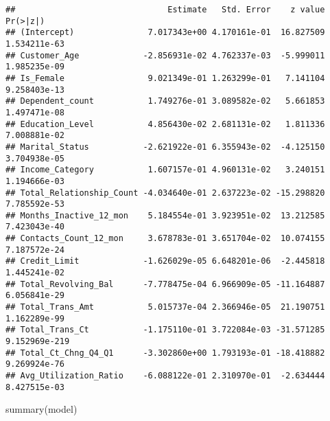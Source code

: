 \documentclass[
]{article}
\newenvironment{Shaded}{\begin{snugshade}}{\end{snugshade}}
\newcommand{\FunctionTok}[1]{\textcolor[rgb]{0.00,0.00,0.00}{#1}}
\newcommand{\NormalTok}[1]{#1}
\begin{document}
\begin{verbatim}
##                               Estimate   Std. Error    z value      Pr(>|z|)
## (Intercept)               7.017343e+00 4.170161e-01  16.827509  1.534211e-63
## Customer_Age             -2.856931e-02 4.762337e-03  -5.999011  1.985235e-09
## Is_Female                 9.021349e-01 1.263299e-01   7.141104  9.258403e-13
## Dependent_count           1.749276e-01 3.089582e-02   5.661853  1.497471e-08
## Education_Level           4.856430e-02 2.681131e-02   1.811336  7.008881e-02
## Marital_Status           -2.621922e-01 6.355943e-02  -4.125150  3.704938e-05
## Income_Category           1.607157e-01 4.960131e-02   3.240151  1.194666e-03
## Total_Relationship_Count -4.034640e-01 2.637223e-02 -15.298820  7.785592e-53
## Months_Inactive_12_mon    5.184554e-01 3.923951e-02  13.212585  7.423043e-40
## Contacts_Count_12_mon     3.678783e-01 3.651704e-02  10.074155  7.187572e-24
## Credit_Limit             -1.626029e-05 6.648201e-06  -2.445818  1.445241e-02
## Total_Revolving_Bal      -7.778475e-04 6.966909e-05 -11.164887  6.056841e-29
## Total_Trans_Amt           5.015737e-04 2.366946e-05  21.190751  1.162289e-99
## Total_Trans_Ct           -1.175110e-01 3.722084e-03 -31.571285 9.152969e-219
## Total_Ct_Chng_Q4_Q1      -3.302860e+00 1.793193e-01 -18.418882  9.269924e-76
## Avg_Utilization_Ratio    -6.088122e-01 2.310970e-01  -2.634444  8.427515e-03
\end{verbatim}

\begin{Shaded}
\begin{Highlighting}[]
\FunctionTok{summary}\NormalTok{(model)}
\end{Highlighting}
\end{Shaded}
\end{document}
